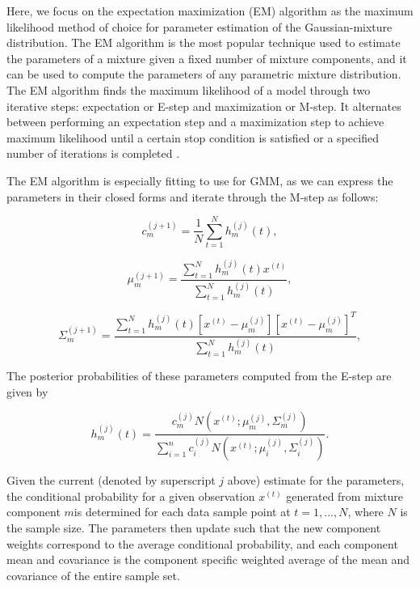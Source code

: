 \documentclass[12pt]{article}
\begin{document}
Here, we focus on the expectation maximization (EM) algorithm as the
maximum likelihood method of choice for parameter estimation of the
Gaussian-mixture distribution. The EM algorithm is the most popular
technique used to estimate the parameters of a mixture given a fixed
number of mixture components, and it can be used to compute the
parameters of any parametric mixture distribution. The EM algorithm
finds the maximum likelihood of a model through two iterative steps:
expectation or E-step and maximization or M-step. It alternates between
performing an expectation step and a maximization step to achieve
maximum likelihood until a certain stop condition is satisfied or a
specified number of iterations is completed \citep{wan2019novel}.

The EM algorithm is especially fitting to use for GMM, as we can express
the parameters in their closed forms and iterate through the M-step as
follows:

\begin{equation}
\label{c}
c_m^{(j+1)} = \frac{1}{N} \sum_{t=1}^N h_m^{(j)}(t),
\end{equation}

\begin{equation}
\label{mu}
\mu_m^{(j+1)} = \frac{\sum_{t=1}^N h_m^{(j)}(t) x^{(t)}}{\sum_{t=1}^N h_m^{(j)}(t)},
\end{equation}

\begin{equation}
\label{sigma}
\Sigma_m^{(j+1)} = \frac{\sum_{t=1}^N h_m^{(j)}(t) [x^{(t)} - \mu_m^{(j)}][x^{(t)} - \mu_m^{(j)}]^T}{\sum_{t=1}^N h_m^{(j)}(t)},
\end{equation}

The posterior probabilities of these parameters computed from the E-step
are given by

\begin{equation}
\label{posterior}
h_m^{(j)}(t) = \frac{c_m^{(j)} N(x^{(t)}; \mu_m^{(j)}, \Sigma_m^{(j)})}{\sum_{i=1}^n c_i^{(j)} N(x^{(t)}; \mu_i^{(j)}, \Sigma_i^{(j)})}.
\end{equation}

Given the current (denoted by superscript \(j\) above) estimate for the
parameters, the conditional probability for a given observation
\(x^{(t)}\) generated from mixture component \(m\)is determined for each
data sample point at \(t=1, ..., N\), where \(N\) is the sample size.
The parameters then update such that the new component weights
correspond to the average conditional probability, and each component
mean and covariance is the component specific weighted average of the
mean and covariance of the entire sample set.
\end{document}
